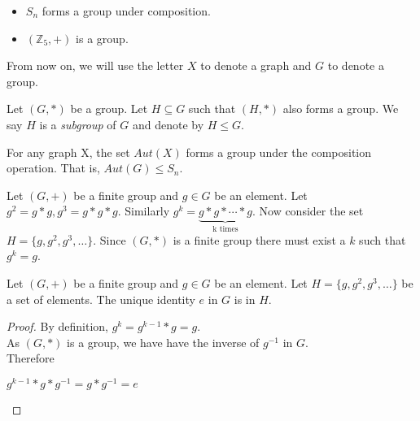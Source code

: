 \begin{eg}
\begin{itemize}
\item $S_n$ forms a group under composition.
\item $(\mathbb{Z}_5,+)$ is a group.
\end{itemize}
\end{eg}

From now on, we will use the letter $X$ to denote a graph and $G$ to denote a group.

\begin{notn} 
Let $(G,*)$ be a group. Let $H\subseteq G$ such that $(H,*)$ also forms a group. We say $H$ is a {\em subgroup} of $G$ and denote by $H\leq G$.   
\end{notn}


\begin{ex}
For any graph X, the set $Aut(X)$ forms a group under the composition operation. That is, $Aut(G)\leq S_n$.
\end{ex}


Let $(G,+)$ be a finite group and $g\in G$ be an element. Let $g^2 =  g*g ,g^3 =  g*g*g $. Similarly $g^k = \underbrace{g*g*\cdots * g}_\text{k times}$. Now consider the set $H=\{g,g^2,g^3,\ldots\}$. Since $(G,*)$ is a finite group there must exist a $k$ such that $g^k=g$.

\begin{lemma}
Let $(G,+)$ be a finite group and $g\in G$ be an element. Let $H=\{g,g^2,g^3,\ldots\}$ be a set of elements. The unique identity $e$ in $G$ is in $H$.
\end{lemma}
\begin{proof}
By definition, $g^k = g^{k-1}*g = g$. \\
As $(G,*)$ is a group, we have have the inverse of $g^{-1}$ in $G$.\\
Therefore
\begin{center}
$g^{k-1}*g*g^{-1} = g*g^{-1} = e$ 
\end{center}
\end{proof}


